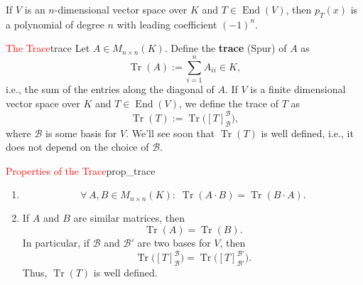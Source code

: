 \begin{remark}
	If $V$ is an $n$-dimensional vector space over $K$ and $T \in \operatorname{End}(V)$, then $p_T(x)$ is a polynomial of degree $n$ with leading coefficient $(-1)^n$.
\end{remark}

\begin{definition}{\textcolor{red}{The Trace}}{trace}
	Let $A \in M_{n\times n}(K)$. Define the \textbf{trace} (Spur) of $A$ as
	\[
		\operatorname{Tr}(A) := \sum_{i=1}^{n} A_{ii} \in K,
	\]
	i.e., the sum of the entries along the diagonal of $A$. If $V$ is a finite dimensional vector space over $K$ and $T \in \operatorname{End}(V)$, we define the trace of $T$ as
	\[
		\operatorname{Tr}(T) := \operatorname{Tr}\big([T]^{\mathcal{B}}_{\mathcal{B}}\big),
	\]
	where $\mathcal{B}$ is some basis for $V$. We'll see soon that $\operatorname{Tr}(T)$ is well defined, i.e., it does not depend on the choice of $\mathcal{B}$.
\end{definition}

\begin{lemma}{\textcolor{red}{Properties of the Trace}}{prop_trace}
	\begin{enumerate}
		\item 
		\[
			\forall \, A,B \in M_{n\times n}(K) : \; \operatorname{Tr}(A\cdot B) = \operatorname{Tr}(B \cdot A).	
		\]
		\item If $A$ and $B$ are similar matrices, then
		\[
			\operatorname{Tr}(A) = \operatorname{Tr}(B).
		\]
		In particular, if $\mathcal{B}$ and $\mathcal{B}'$ are two bases for $V$, then
		\[
			\operatorname{Tr}\big([T]^{\mathcal{B}}_{\mathcal{B}}\big) = \operatorname{Tr}\big([T]^{\mathcal{B}'}_{\mathcal{B}'}\big).
		\]
		Thus, $\operatorname{Tr}(T)$ is well defined.
	\end{enumerate}
\end{lemma}

